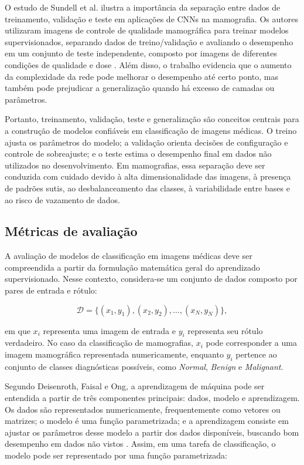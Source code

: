 \documentclass[
    12pt,
    openright,
    oneside,
    a4paper,
    english,
    brazil
]{abntex2}
\begin{document}
O estudo de Sundell et al. ilustra a importância da separação entre dados de treinamento, validação e teste em aplicações de CNNs na mamografia. Os autores utilizaram imagens de controle de qualidade mamográfica para treinar modelos supervisionados, separando dados de treino/validação e avaliando o desempenho em um conjunto de teste independente, composto por imagens de diferentes condições de qualidade e dose \cite{sundell2022cnn}. Além disso, o trabalho evidencia que o aumento da complexidade da rede pode melhorar o desempenho até certo ponto, mas também pode prejudicar a generalização quando há excesso de camadas ou parâmetros.

Portanto, treinamento, validação, teste e generalização são conceitos centrais para a construção de modelos confiáveis em classificação de imagens médicas. O treino ajusta os parâmetros do modelo; a validação orienta decisões de configuração e controle de sobreajuste; e o teste estima o desempenho final em dados não utilizados no desenvolvimento. Em mamografias, essa separação deve ser conduzida com cuidado devido à alta dimensionalidade das imagens, à presença de padrões sutis, ao desbalanceamento das classes, à variabilidade entre bases e ao risco de vazamento de dados.

\subsection{Métricas de avaliação}
\label{subsec:metricas_avaliacao}

A avaliação de modelos de classificação em imagens médicas deve ser compreendida a partir da formulação matemática geral do aprendizado supervisionado. Nesse contexto, considera-se um conjunto de dados composto por pares de entrada e rótulo:

\[
\mathcal{D} = \{(x_1,y_1),(x_2,y_2),\ldots,(x_N,y_N)\},
\]

em que \(x_i\) representa uma imagem de entrada e \(y_i\) representa seu rótulo verdadeiro. No caso da classificação de mamografias, \(x_i\) pode corresponder a uma imagem mamográfica representada numericamente, enquanto \(y_i\) pertence ao conjunto de classes diagnósticas possíveis, como \textit{Normal}, \textit{Benign} e \textit{Malignant}.

Segundo Deisenroth, Faisal e Ong, a aprendizagem de máquina pode ser entendida a partir de três componentes principais: dados, modelo e aprendizagem. Os dados são representados numericamente, frequentemente como vetores ou matrizes; o modelo é uma função parametrizada; e a aprendizagem consiste em ajustar os parâmetros desse modelo a partir dos dados disponíveis, buscando bom desempenho em dados não vistos \cite{deisenroth2020mathematics}. Assim, em uma tarefa de classificação, o modelo pode ser representado por uma função parametrizada:
\end{document}
